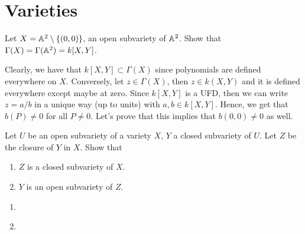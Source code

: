 \section{Varieties}

\begin{exercise}
    Let $X = \mathbb{A}^2\setminus \{(0,0)\}$, an open subvariety of $\mathbb{A}^2$. Show that $\Gamma(X) = \Gamma(\mathbb{A}^2) = k[X,Y]$. \\
\end{exercise}

\begin{solution}
    Clearly, we have that $k[X,Y] \subset \Gamma(X)$ since polynomials are defined everywhere on $X$. Conversely, let $z \in \Gamma(X)$, then $z \in k(X,Y)$ and it is defined everywhere except maybe at zero. Since $k[X,Y]$ is a UFD, then we can write $z = a/b$ in a unique way (up to units) with $a,b \in k[X,Y]$. Hence, we get that $b(P) \neq 0$ for all $P \neq 0$. Let's prove that this implies that $b(0,0) \neq 0$ as well. \td \\
\end{solution}

\begin{exercise}
    Let $U$ be an open subvariety of a variety $X$, $Y$ a closed subvariety of $U$. Let $Z$ be the closure of $Y$ in $X$. Show that
    \begin{enumerate}
        \item $Z$ is a closed subvariety of $X$.
        \item $Y$ is an open subvariety of $Z$.\\
    \end{enumerate}
\end{exercise}

\begin{solution}
    \begin{enumerate}
        \item \td
        \item \td \\
    \end{enumerate}
\end{solution}

\begin{exercise}
    \td \\
\end{exercise}

\begin{solution}
    \td \\
\end{solution}

\begin{exercise}
    \td \\
\end{exercise}

\begin{solution}
    \td \\
\end{solution}

